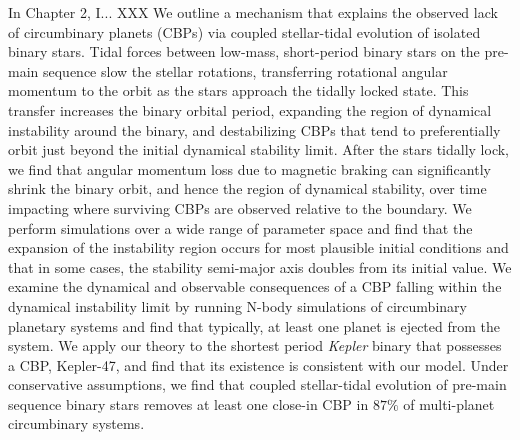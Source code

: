 In Chapter 2, I... XXX
We outline a mechanism that explains the observed lack of circumbinary planets (CBPs) via coupled stellar-tidal evolution of isolated binary stars.  Tidal forces between low-mass, short-period binary stars on the pre-main sequence slow the stellar rotations, transferring rotational angular momentum to the orbit as the stars approach the tidally locked state.  This transfer increases the binary orbital period, expanding the region of dynamical instability around the binary, and destabilizing CBPs that tend to preferentially orbit just beyond the initial dynamical stability limit.  After the stars tidally lock, we find that angular momentum loss due to magnetic braking can significantly shrink the binary orbit, and hence the region of dynamical stability, over time impacting where surviving CBPs are observed relative to the boundary.  We perform simulations over a wide range of parameter space and find that the expansion of the instability region occurs for most plausible initial conditions and that in some cases, the stability semi-major axis doubles from its initial value.  We examine the dynamical and observable consequences of a CBP falling within the dynamical instability limit by running N-body simulations of circumbinary planetary systems and find that typically, at least one planet is ejected from the system.  We apply our theory to the shortest period {\it Kepler} binary that possesses a CBP, Kepler-47, and find that its existence is consistent with our model.  Under conservative assumptions, we find that coupled stellar-tidal evolution of pre-main sequence binary stars removes at least one close-in CBP in $87\%$ of multi-planet circumbinary systems.


